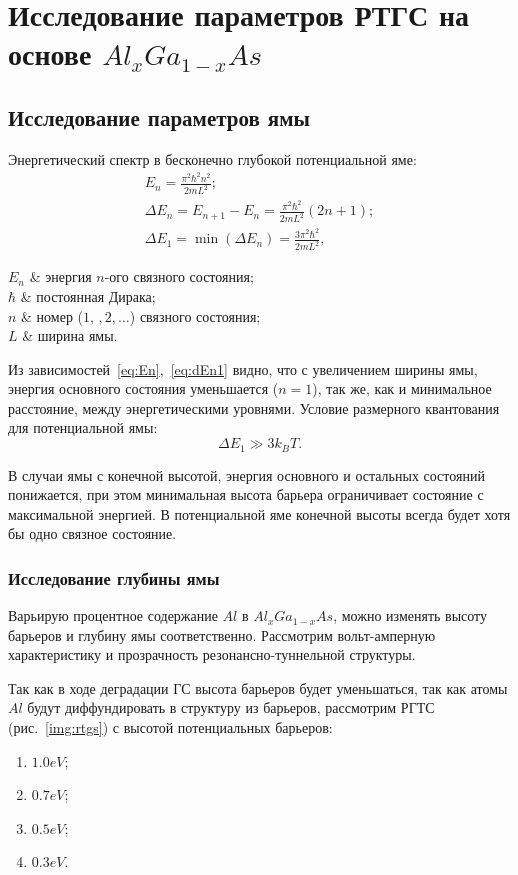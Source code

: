 \chapter{Исследование параметров РТГС на основе $Al_{x}Ga_{1-x}As$}
\section{Исследование параметров ямы}
Энергетический спектр в бесконечно глубокой потенциальной яме:
\begin{gather}
	\label{eq:En}
	E_{n} = \frac{\pi^{2}\hbar^{2}n^{2}}{2mL^{2}};\\
	\Delta E_{n} = E_{n+1} - E_{n} = \frac{\pi^{2}\hbar^{2}}{2mL^{2}}(2n + 1);\\
	\label{eq:dEn1}
	\Delta E_{1} = \min(\Delta E_{n}) = \frac{3\pi^{2}\hbar^{2}}{2mL^{2}},
\end{gather}
\begin{conditions}
	$E_{n}$ & энергия $n$-ого связного состояния;\\
	$\hbar$ & постоянная Дирака;\\
	$n$ & номер ($1,\,,2,\dots$) связного состояния;\\
	$L$ & ширина ямы.
\end{conditions}

Из зависимостей~\ref{eq:En},~\ref{eq:dEn1}  видно, что с увеличением ширины ямы, энергия основного состояния уменьшается ($n = 1$), так же, как и минимальное расстояние, между энергетическими уровнями. Условие размерного квантования для потенциальной ямы:
\begin{equation}
	\Delta E_{1} \gg 3k_{B}T.
\end{equation}

В случаи ямы с конечной высотой, энергия основного и остальных состояний понижается, при этом минимальная высота барьера ограничивает состояние с максимальной энергией. В потенциальной яме конечной высоты всегда будет хотя бы одно связное состояние.

\subsection{Исследование глубины ямы}
Варьирую процентное содержание $Al$ в $Al_{x}Ga_{1-x}As$, можно изменять высоту барьеров и глубину ямы соответственно. Рассмотрим вольт-амперную характеристику и прозрачность резонансно-туннельной структуры.

Так как в ходе деградации ГС высота барьеров будет уменьшаться, так как атомы $Al$ будут диффундировать в структуру из барьеров, рассмотрим РГТС (рис.~\ref{img:rtgs}) с высотой потенциальных барьеров:
\begin{enumerate}
	\item $1.0 eV$;
	\item $0.7 eV$;
	\item $0.5 eV$;
	\item $0.3 eV$.
\end{enumerate}

